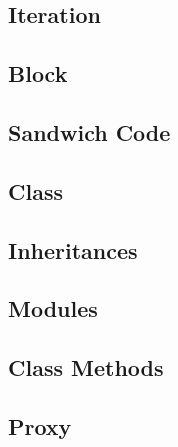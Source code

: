 \subsection{Iteration}

\subsection{Block}

\subsection{Sandwich Code}

\subsection{Class}

\subsection{Inheritances}

\subsection{Modules}

\subsection{Class Methods}

\subsection{Proxy}





























